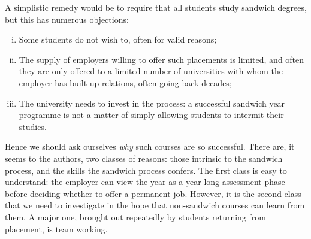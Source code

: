 \documentclass[sigconf]{acmart}
\begin{document}


A simplistic remedy would be to require that all students study
sandwich degrees, but this has numerous objections:

\begin{enumerate}[i)]
\item Some students do not wish to, often for valid reasons;
\item The supply of employers willing to offer such placements is
limited, and often they are only offered to a limited number of
universities with whom the employer has built up relations, often
going back decades;
\item The university needs to invest in the process: a successful
sandwich year programme is not a matter of simply allowing students to
intermit their studies.
\end{enumerate}

Hence we should ask ourselves \emph{why} such courses are so
successful.
There are, it seems to the
authors, two classes of reasons: those intrinsic to the sandwich
process, and the skills the sandwich process confers. The first class
is easy to understand: the employer can view the year as a year-long
assessment phase before deciding whether to offer a permanent
job. %
However, it is the second class that we
need to investigate in the hope that non-sandwich courses can learn from them. A major one, brought out repeatedly by students
returning from placement, is team working.
\end{document}
